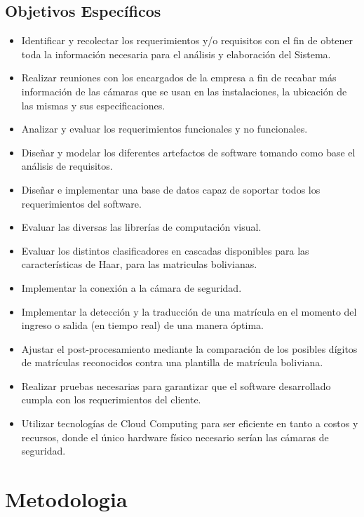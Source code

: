     \subsection{Objetivos Específicos}
    \begin{itemize}
    \item Identificar y recolectar los requerimientos y/o requisitos con el fin de obtener toda la información necesaria para el análisis y elaboración del Sistema.
    \item Realizar reuniones con los encargados de la empresa a fin de recabar más información de las cámaras que se usan en las instalaciones, la ubicación de las mismas y sus especificaciones.
    \item Analizar y evaluar los requerimientos funcionales y no funcionales.
    \item Diseñar y modelar los diferentes artefactos de software tomando como base el análisis de requisitos.
    \item Diseñar e implementar una base de datos capaz de soportar todos los requerimientos del software.
    \item Evaluar las diversas las librerías de computación visual.
    \item Evaluar los distintos clasificadores en cascadas disponibles para las características de Haar, para las matriculas bolivianas.
    \item Implementar la conexión a la cámara de seguridad.
    \item Implementar la detección y la traducción de una matrícula en el momento del ingreso o salida (en tiempo real) de una manera óptima.
    \item Ajustar el post-procesamiento mediante la comparación de los posibles dígitos de matrículas reconocidos contra una plantilla de matrícula boliviana.
    \item Realizar pruebas necesarias para garantizar que el software desarrollado cumpla con los requerimientos del cliente.
    \item Utilizar tecnologías de Cloud Computing para ser eficiente en tanto a costos y recursos, donde el único hardware físico necesario serían las cámaras de seguridad. 

    \end{itemize}
\section{Metodologia}
